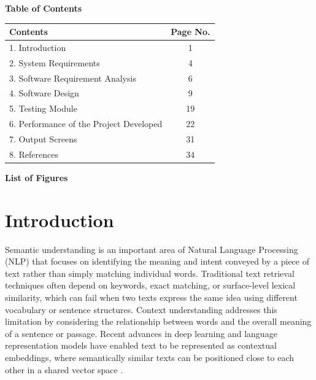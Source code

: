 \documentclass[12pt,a4paper]{article}
\begin{document}


\newpage
\clearpage
{}

\begin{center}
\textbf{\Large Table of Contents}
\end{center}

\begin{table}[H]
\centering
\renewcommand{\arraystretch}{1.4}

\begin{tabular}{|p{11cm}|c|}
\hline
\textbf{Contents} & \textbf{Page No.} \\
\hline
1. Introduction & 1 \\
\hline
2. System Requirements & 4 \\
\hline
3. Software Requirement Analysis & 6 \\
\hline
4. Software Design & 9 \\
\hline
5. Testing Module & 19 \\
\hline
6. Performance of the Project Developed & 22 \\
\hline
7. Output Screens & 31 \\
\hline
8. References & 34 \\
\hline
\end{tabular}
\end{table}

\newpage
\begin{center}
\textbf{\Large List of Figures}
\end{center}
\listoffigures



\clearpage
{}
\setcounter{page}{1}
\newpage
\section{Introduction}

Semantic understanding is an important area of Natural Language Processing (NLP) that focuses on identifying the meaning and intent conveyed by a piece of text rather than simply matching individual words. Traditional text retrieval techniques often depend on keywords, exact matching, or surface-level lexical similarity, which can fail when two texts express the same idea using different vocabulary or sentence structures. Context understanding addresses this limitation by considering the relationship between words and the overall meaning of a sentence or passage. Recent advances in deep learning and language representation models have enabled text to be represented as contextual embeddings, where semantically similar texts can be positioned close to each other in a shared vector space \cite{feng2022labse, wang2024multilinguale5}.
\end{document}
